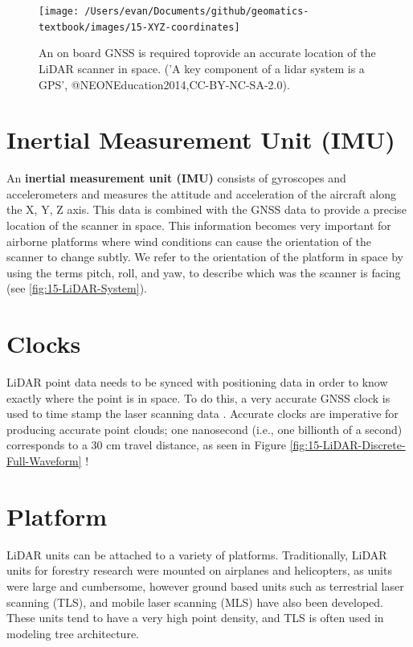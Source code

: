 \documentclass[
]{book}
\begin{document}
\begin{figure}
\texttt{[image: /Users/evan/Documents/github/geomatics-textbook/images/15-XYZ-coordinates]} \caption{An on board GNSS is required toprovide an accurate location of the LiDAR scanner in space. ('A key component of a lidar system is a GPS', @NEONEducation2014,CC-BY-NC-SA-2.0).}\label{fig:15-XYZ-coordinates}
\end{figure}

\hypertarget{inertial-measurement-unit-imu}{%
\section{Inertial Measurement Unit (IMU)}\label{inertial-measurement-unit-imu}}

An \textbf{inertial measurement unit (IMU)} consists of gyroscopes and accelerometers and measures the attitude and acceleration of the aircraft along the X, Y, Z axis. This data is combined with the GNSS data to provide a precise location of the scanner in space. This information becomes very important for airborne platforms where wind conditions can cause the orientation of the scanner to change subtly. We refer to the orientation of the platform in space by using the terms pitch, roll, and yaw, to describe which was the scanner is facing (see \ref{fig:15-LiDAR-System}).

\hypertarget{clocks}{%
\section{Clocks}\label{clocks}}

LiDAR point data needs to be synced with positioning data in order to know exactly where the point is in space. To do this, a very accurate GNSS clock is used to time stamp the laser scanning data \citep{UFGeomatics-FortLauderdale2016a}. Accurate clocks are imperative for producing accurate point clouds; one nanosecond (i.e., one billionth of a second) corresponds to a 30 cm travel distance, as seen in Figure \ref{fig:15-LiDAR-Discrete-Full-Waveform} \citep{UFGeomatics-FortLauderdale2016}!

\hypertarget{platform}{%
\section{Platform}\label{platform}}

LiDAR units can be attached to a variety of platforms. Traditionally, LiDAR units for forestry research were mounted on airplanes and helicopters, as units were large and cumbersome, however ground based units such as terrestrial laser scanning (TLS), and mobile laser scanning (MLS) have also been developed. These units tend to have a very high point density, and TLS is often used in modeling tree architecture.
\end{document}
